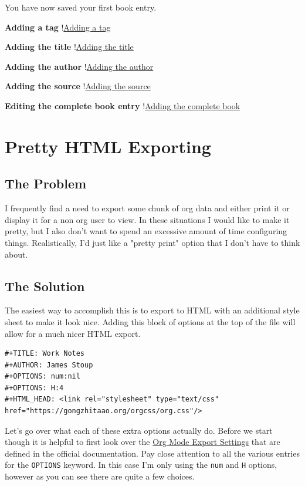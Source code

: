 \documentclass[11pt]{article}
\begin{document}
You have now saved your first book entry.

\textbf{Adding a tag}
!\href{images/fantasy-tag.png}{Adding a tag}

\textbf{Adding the title}
!\href{images/book-title.png}{Adding the title}

\textbf{Adding the author}
!\href{images/book-author.png}{Adding the author}

\textbf{Adding the source}
!\href{images/book-source.png}{Adding the source}

\textbf{Editing the complete book entry}
!\href{images/new-book-capture.png}{Adding the complete book}
\section*{Pretty HTML Exporting}
\label{sec:org4c5f492}
\subsection*{The Problem}
\label{sec:orgebca937}
I frequently find a need to export some chunk of org data and either print it or display it for a non org user to view. In these situations I would like to make it pretty, but I also don't want to spend an excessive amount of time configuring things. Realistically, I'd just like a "pretty print" option that I don't have to think about.
\subsection*{The Solution}
\label{sec:org656ded8}
The easiest way to accomplish this is to export to HTML with an additional style sheet to make it look nice. Adding this block of options at the top of the file will allow for a much nicer HTML export.

\begin{verbatim}
#+TITLE: Work Notes
#+AUTHOR: James Stoup
#+OPTIONS: num:nil
#+OPTIONS: H:4
#+HTML_HEAD: <link rel="stylesheet" type="text/css" href="https://gongzhitaao.org/orgcss/org.css"/>
\end{verbatim}

Let's go over what each of these extra options actually do. Before we start though it is helpful to first look over the \href{https://orgmode.org/manual/Export-Settings.html}{Org Mode Export Settings} that are defined in the official documentation. Pay close attention to all the various entries for the \texttt{OPTIONS} keyword. In this case I'm only using the \texttt{num} and \texttt{H} options, however as you can see there are quite a few choices.
\end{document}

